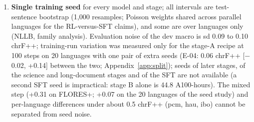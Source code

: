 \begin{enumerate}
\item \textbf{Single training seed} for every model and stage; all intervals are test-sentence bootstrap (1,000 resamples; Poisson weights shared across parallel languages for the RL-versus-SFT claims), and some are over languages only (NLLB, family analysis). Evaluation noise of the dev macro is sd 0.09 to 0.10 chrF++; training-run variation was measured only for the stage-A recipe at 100 steps on 20 languages with one pair of extra seeds (E-04: 0.06 chrF++ [\ensuremath{-}0.02, +0.14] between the two; Appendix~\ref{app:split}); seeds of later stages, of the science and long-document stages and of the SFT are not available (a second SFT seed is impractical: stage B alone is 44.8 A100-hours). The mixed step (+0.31 on FLORES+; +0.07 on the 20 languages of the seed study) and per-language differences under about 0.5 chrF++ (pcm, hau, ibo) cannot be separated from seed noise.
\end{enumerate}
